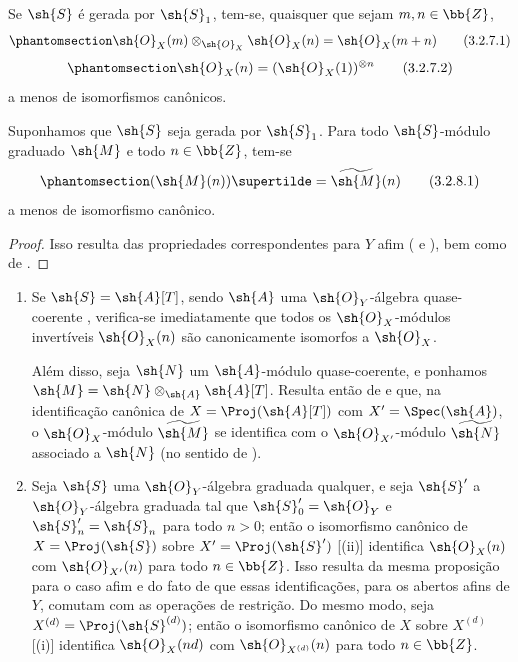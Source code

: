 \documentclass[oneside,10pt]{amsart}
\newcommand{\oldpage}[2][]{\marginnote{\normalfont\footnotesize\textbf{#1}~|~#2}\ignorespaces}
\let\EGAOriginalLabel\label
\renewcommand{\label}[1]{\phantomsection\EGAOriginalLabel{#1}}
\begin{document}
\begin{corollary}[3.2.7]
\label{II.3.2.7}
Se $\sh{S}$ é gerada por $\sh{S}_1$, tem-se, quaisquer que sejam $m,n\in\bb{Z}$,
\[
\label{II.3.2.7.1}
  \sh{O}_X(m)\otimes_{\sh{O}_X}\sh{O}_X(n)=\sh{O}_X(m+n)
\tag{3.2.7.1}
\]
\[
\label{II.3.2.7.2}
  \sh{O}_X(n)=(\sh{O}_X(1))^{\otimes n}
\tag{3.2.7.2}
\]
a menos de isomorfismos canônicos.
\end{corollary}
\oldpage[II]{56}

\begin{corollary}[3.2.8]
\label{II.3.2.8}
Suponhamos que $\sh{S}$ seja gerada por $\sh{S}_1$.
Para todo $\sh{S}$-módulo graduado $\sh{M}$ e todo $n\in\bb{Z}$, tem-se
\[
\label{II.3.2.8.1}
  (\sh{M}(n))\supertilde=\widetilde{\sh{M}}(n)
\tag{3.2.8.1}
\]
a menos de isomorfismo canônico.
\end{corollary}

\begin{proof}
Isso resulta das propriedades correspondentes para $Y$ afim ( e ), bem como de .
\end{proof}

\begin{remarks}[3.2.9]
\label{II.3.2.9}
\medskip\noindent
\begin{enumerate}
  \item[\rm{(i)}] Se $\sh{S}=\sh{A}[T]$, sendo $\sh{A}$ uma $\sh{O}_Y$-álgebra quase-coerente , verifica-se imediatamente que todos os $\sh{O}_X$-módulos invertíveis $\sh{O}_X(n)$ são canonicamente isomorfos a $\sh{O}_X$.

  Além disso, seja $\sh{N}$ um $\sh{A}$-módulo quase-coerente, e ponhamos $\sh{M}=\sh{N}\otimes_{\sh{A}}\sh{A}[T]$.
  Resulta então de  e  que, na identificação canônica de $X=\Proj(\sh{A}[T])$ com $X'=\Spec(\sh{A})$, o $\sh{O}_X$-módulo $\widetilde{\sh{M}}$ se identifica com o $\sh{O}_{X'}$-módulo $\widetilde{\sh{N}}$ associado a $\sh{N}$ (no sentido de ).
  \item[\rm{(ii)}] Seja $\sh{S}$ uma $\sh{O}_Y$-álgebra graduada qualquer, e seja $\sh{S}'$ a $\sh{O}_Y$-álgebra graduada tal que $\sh{S}'_0=\sh{O}_Y$ e $\sh{S}'_n=\sh{S}_n$ para todo $n>0$;
  então o isomorfismo canônico de $X=\Proj(\sh{S})$ sobre $X'=\Proj(\sh{S}')$ [(ii)] identifica $\sh{O}_X(n)$ com $\sh{O}_{X'}(n)$ para todo $n\in\bb{Z}$.
  Isso resulta da mesma proposição para o caso afim  e do fato de que essas identificações, para os abertos afins de $Y$, comutam com as operações de restrição.
  Do mesmo modo, seja $X^{(d)}=\Proj(\sh{S}^{(d)})$;
  então o isomorfismo canônico de $X$ sobre $X^{(d)}$ [(i)] identifica $\sh{O}_X(nd)$ com $\sh{O}_{X^{(d)}}(n)$ para todo $n\in\bb{Z}$.
\end{enumerate}
\end{remarks}
\end{document}
